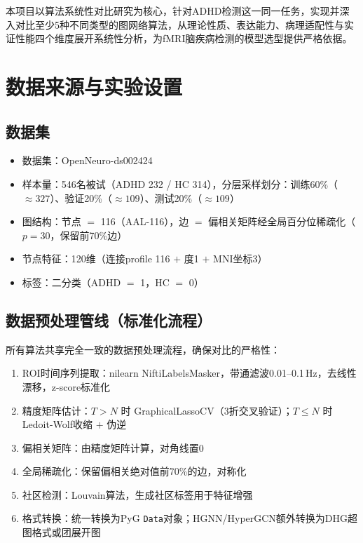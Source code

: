 \documentclass[12pt,a4paper,heading=true,fontset=windows]{ctexart}
\newcommand{\kw}[1]{{\heiti #1}}
\begin{document}
本项目以\kw{算法系统性对比研究}为核心，针对ADHD检测这一同一任务，实现并深入对比至少5种不同类型的图网络算法，从理论性质、表达能力、病理适配性与实证性能四个维度展开系统性分析，为fMRI脑疾病检测的模型选型提供严格依据。

\section{数据来源与实验设置}

\subsection{数据集}

\begin{itemize}
    \item \kw{数据集}：OpenNeuro-ds002424
    \item \kw{样本量}：546名被试（ADHD 232 / HC 314），分层采样划分：训练60\%（$\approx 327$）、验证20\%（$\approx 109$）、测试20\%（$\approx 109$）
    \item \kw{图结构}：节点 $=$ 116（AAL-116），边 $=$ 偏相关矩阵经全局百分位稀疏化（$p=30$，保留前70\%边）
    \item \kw{节点特征}：120维（连接profile 116 $+$ 度1 $+$ MNI坐标3）
    \item \kw{标签}：二分类（ADHD $=$ 1，HC $=$ 0）
\end{itemize}

\subsection{数据预处理管线（标准化流程）}

所有算法共享\kw{完全一致}的数据预处理流程，确保对比的严格性：

\begin{enumerate}[leftmargin=3em]
    \item \kw{ROI时间序列提取}：nilearn NiftiLabelsMasker，带通滤波0.01--0.1\,Hz，去线性漂移，z-score标准化
    \item \kw{精度矩阵估计}：$T > N$ 时 GraphicalLassoCV（3折交叉验证）；$T \leq N$ 时 Ledoit-Wolf收缩 $+$ 伪逆
    \item \kw{偏相关矩阵}：由精度矩阵计算，对角线置0
    \item \kw{全局稀疏化}：保留偏相关绝对值前70\%的边，对称化
    \item \kw{社区检测}：Louvain算法，生成社区标签用于特征增强
    \item \kw{格式转换}：统一转换为PyG \texttt{Data}对象；HGNN/HyperGCN额外转换为DHG超图格式或团展开图
\end{enumerate}
\end{document}
